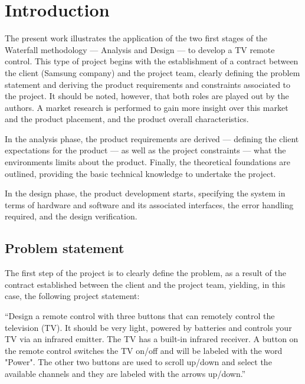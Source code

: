 %
%
%
\chapter{Introduction}%
\label{ch:introduction}
The present work illustrates the application of the two first stages of the Waterfall methodology
--- Analysis and Design --- to develop a TV remote control. This type of project
begins with the establishment of a contract between the client (Samsung company)
and the project team, clearly defining the problem statement and deriving the
product requirements and constraints associated to the project. It should be
noted, however, that both roles are played out by the authors.
A market
research is performed to gain more insight over this market and the
product placement, and the product overall characteristics.

In the analysis
phase, the product requirements are derived --- defining the client expectations
for the product --- as well as the project constraints --- what the environments
limits about the product. Finally, the theoretical foundations are outlined,
providing the basic technical knowledge to undertake the project.

In the design phase, the product development starts, specifying the system in
terms of hardware and software and its associated interfaces, the error handling
required, and the design verification.

\section{Problem statement}
\label{sec:prob-stat}
The first step of the project is to clearly define the problem, as a result of
the contract established between the client and the project team, yielding, in
this case, the following project statement:

``Design a remote control with three buttons that can
remotely control the television (TV). It should be very
light, powered by batteries and controls your TV via an
infrared emitter. The TV has a built-in infrared receiver. A
button on the remote control switches the TV on/off and
will be labeled with the word "Power". The other two
buttons are used to scroll up/down and select the available
channels and they are labeled with the arrows up/down.''

